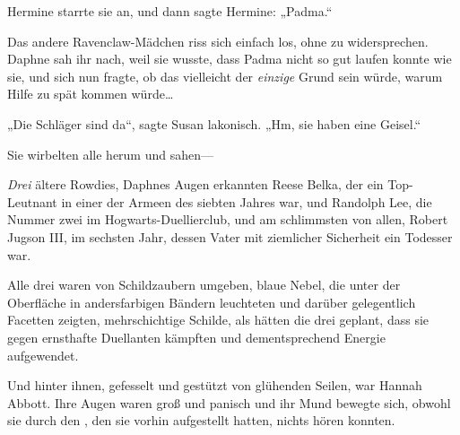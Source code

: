 Hermine starrte sie an, und dann sagte Hermine: „Padma.“

Das andere Ravenclaw-Mädchen riss sich einfach los, ohne zu widersprechen. Daphne sah ihr nach, weil sie wusste, dass Padma nicht so gut laufen konnte wie sie, und sich nun fragte, ob das vielleicht der \emph{einzige} Grund sein würde, warum Hilfe zu spät kommen würde…

„Die Schläger sind da“, sagte Susan lakonisch. „Hm, sie haben eine Geisel.“

Sie wirbelten alle herum und sahen—

\emph{Drei} ältere Rowdies, Daphnes Augen erkannten Reese Belka, der ein Top-Leutnant in einer der Armeen des siebten Jahres war, und Randolph Lee, die Nummer zwei im Hogwarts-Duellierclub, und am schlimmsten von allen, Robert Jugson III, im sechsten Jahr, dessen Vater mit ziemlicher Sicherheit ein Todesser war.

Alle drei waren von Schildzaubern umgeben, blaue Nebel, die unter der Oberfläche in andersfarbigen Bändern leuchteten und darüber gelegentlich Facetten zeigten, mehrschichtige Schilde, als hätten die drei geplant, dass sie gegen ernsthafte Duellanten kämpften und dementsprechend Energie aufgewendet.

Und hinter ihnen, gefesselt und gestützt von glühenden Seilen, war Hannah Abbott. Ihre Augen waren groß und panisch und ihr Mund bewegte sich, obwohl sie durch den , den sie vorhin aufgestellt hatten, nichts hören konnten.


